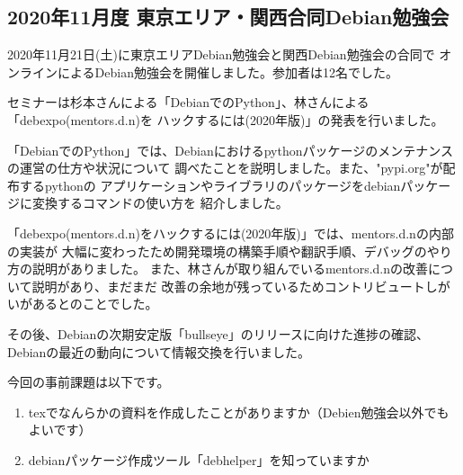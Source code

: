 \documentclass[mingoth,a4paper]{jsarticle}
\begin{document}

\subsection{2020年11月度 東京エリア・関西合同Debian勉強会}

2020年11月21日(土)に東京エリアDebian勉強会と関西Debian勉強会の合同で
オンラインによるDebian勉強会を開催しました。参加者は12名でした。

セミナーは杉本さんによる「DebianでのPython」、林さんによる「debexpo(mentors.d.n)を
ハックするには(2020年版)」の発表を行いました。

「DebianでのPython」では、Debianにおけるpythonパッケージのメンテナンスの運営の仕方や状況について
調べたことを説明しました。また、"pypi.org"が配布するpythonの
アプリケーションやライブラリのパッケージをdebianパッケージに変換するコマンドの使い方を
紹介しました。

「debexpo(mentors.d.n)をハックするには(2020年版)」では、mentors.d.nの内部の実装が
大幅に変わったため開発環境の構築手順や翻訳手順、デバッグのやり方の説明がありました。
また、林さんが取り組んでいるmentors.d.nの改善について説明があり、まだまだ
改善の余地が残っているためコントリビュートしがいがあるとのことでした。


その後、Debianの次期安定版「bullseye」のリリースに向けた進捗の確認、
Debianの最近の動向について情報交換を行いました。


今回の事前課題は以下です。

\begin{enumerate}
\item texでなんらかの資料を作成したことがありますか（Debien勉強会以外でもよいです）
\item debianパッケージ作成ツール「debhelper」を知っていますか
\end{enumerate}


\begin{multicols}{2}
{\small

}
\end{multicols}
\end{document}
